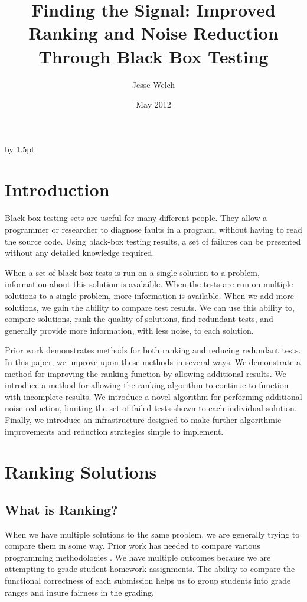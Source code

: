\documentclass[11pt,twoside]{article}
\theoremstyle{definition}
\let\cite=\citep
\begin{document}
\advance\extrarowheight by 1.5pt

\title{Finding the Signal: Improved Ranking and Noise Reduction Through Black Box Testing}
\author{Jesse Welch}
\date{May 2012}

\pagestyle{headings}


\maketitle

\tableofcontents
\newpage

\baselineskip %


\section{Introduction}
Black-box testing sets are useful for many different people. They allow a programmer or researcher to diagnose faults in a program, without having to read the source code. Using black-box testing results, a set of failures can be presented without any detailed knowledge required.

When a set of black-box tests is run on a single solution to a problem, information about this solution is avalaible. When the tests are run on multiple solutions to a single problem, more information is available. When we add more solutions, we gain the ability to compare test results. We can use this ability to, compare solutions, rank the quality of solutions, find redundant tests, and generally provide more information, with less noise, to each solution.

Prior work demonstrates methods for both ranking and reducing redundant tests. In this paper, we improve upon these methods in several ways. We demonstrate a method for improving the ranking function by allowing additional results. We introduce a method for allowing the ranking algorithm to continue to function with incomplete results. We introduce a novel algorithm for performing additional noise reduction, limiting the set of failed tests shown to each individual solution. Finally, we introduce an infrastructure designed to make further algorithmic improvements and reduction strategies simple to implement.

\section{Ranking Solutions}
\subsection{What is Ranking?}
When we have multiple solutions to the same problem, we are generally trying to compare them in some way. Prior work has needed to compare various programming methodologies \cite{Claessen}. We have multiple outcomes because we are attempting to grade student homework assignments. The ability to compare the functional correctness of each submission helps us to group students into grade ranges and insure fairness in the grading.
\end{document}
